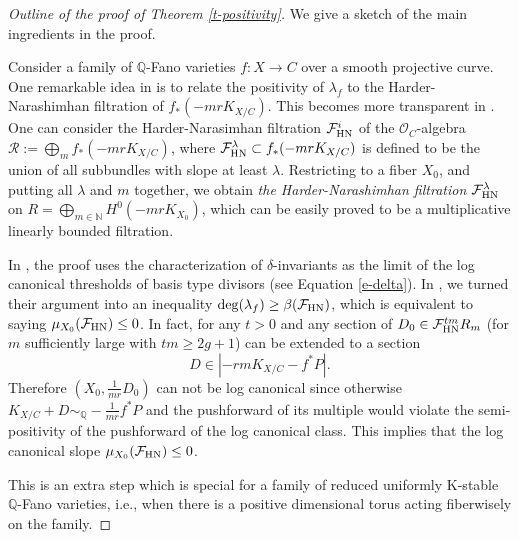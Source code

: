 \documentclass[12pt,reqno]{amsart}%
\newcommand{\bN}{{\mathbb{N} }}
\newcommand{\cR}{{\mathcal{R}}}
\newcommand{\cF}{\mathcal{F}}
\theoremstyle{definition}
\theoremstyle{remark}
\newcommand{\bQ}{{\mathbb{Q}}}
\newcommand{\la}{\lambda}
\begin{document}
\begin{proof}[Outline of the proof of Theorem \ref{t-positivity}] We give a sketch of the main ingredients in the proof.

\medskip



Consider a family of $\bQ$-Fano varieties $f\colon X\to C$ over a smooth projective curve. One remarkable idea in \cite{CP18} is to relate the positivity of $\lambda_f$ to the  Harder-Narashimhan filtration of $f_*(-mrK_{X/C})$. This becomes more transparent in \cite{XZ19}. One can consider the Harder-Narasimhan filtration $\cF^i_{\rm HN}$ of the $\mathcal{O}_C$-algebra $\cR:=\bigoplus_m f_*(-mrK_{X/C})$, where $\cF^{\la}_{\rm HN}\subset f_*(-mrK_{X/C})$ is defined to be the union of all subbundles with slope at least $\la$. Restricting to a fiber $X_0$, and putting all $\la$ and $m$ together, we obtain {\it the Harder-Narashimhan filtration $\cF^{\la}_{\rm HN}$} on $R=\bigoplus_{m\in \bN}H^0(-mrK_{X_0})$, which can be easily proved to be a multiplicative linearly bounded filtration. 

 In \cite{CP18},  the proof uses the characterization of $\delta$-invariants as the limit of the log canonical thresholds of basis type divisors (see Equation \eqref{e-delta}). In \cite{XZ19}, we turned their argument into an inequality $\deg(\lambda_{f})\ge \beta(\cF_{\rm HN})$, which is equivalent to saying $\mu_{X_0}(\cF_{\rm HN})\le 0$. 
 In fact, for any $t> 0$ and any section of $D_0\in \cF^{tm}_{\rm HN}R_m$ (for $m$ sufficiently large with $tm\ge 2g+1$) can be extended to a section 
 $$D\in |-rmK_{X/C}-f^*P|.$$ Therefore $(X_0,\frac{1}{mr}D_0)$ can not be log canonical since otherwise $ K_{X/C}+D\sim_{\bQ} -\frac{1}{mr}f^*P$ and the pushforward of its multiple would violate the semi-positivity of the pushforward of the log canonical class. This implies that the log canonical slope $\mu_{X_0}(\cF_{\rm HN})\le 0$. 

\medskip


This is an extra step which is special for a family of reduced uniformly K-stable $\bQ$-Fano varieties, i.e., when there is a positive dimensional torus acting fiberwisely on the family. 
 

\end{proof}
\end{document}

